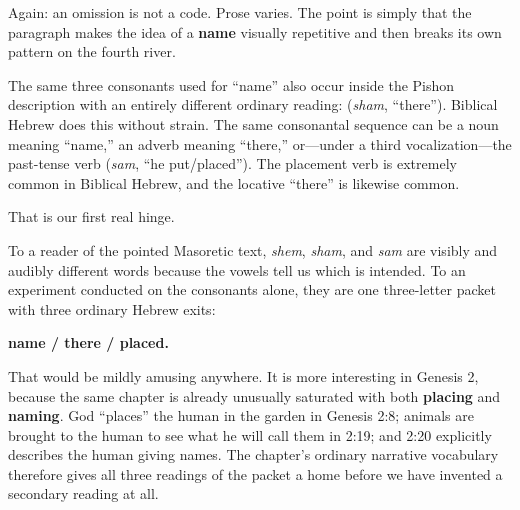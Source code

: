 
Again: an omission is not a code. Prose varies. The point is simply that the paragraph makes the idea of a \textbf{name} visually repetitive and then breaks its own pattern on the fourth river.\cite{MasoreticGenesis}

The same three consonants used for ``name'' also occur inside the Pishon description with an entirely different ordinary reading:  (\textit{sham}, ``there''). Biblical Hebrew does this without strain. The same consonantal sequence can be a noun meaning ``name,'' an adverb meaning ``there,'' or---under a third vocalization---the past-tense verb  (\textit{sam}, ``he put/placed''). The placement verb is extremely common in Biblical Hebrew, and the locative ``there'' is likewise common.\cite{BDB}

That is our first real hinge.

To a reader of the pointed Masoretic text, \textit{shem}, \textit{sham}, and \textit{sam} are visibly and audibly different words because the vowels tell us which is intended. To an experiment conducted on the consonants alone, they are one three-letter packet with three ordinary Hebrew exits:

\textbf{name / there / placed.}

That would be mildly amusing anywhere. It is more interesting in Genesis 2, because the same chapter is already unusually saturated with both \textbf{placing} and \textbf{naming}. God ``places'' the human in the garden in Genesis 2:8; animals are brought to the human to see what he will call them in 2:19; and 2:20 explicitly describes the human giving names. The chapter's ordinary narrative vocabulary therefore gives all three readings of the packet a home before we have invented a secondary reading at all.\cite{MasoreticGenesis,BDB}

